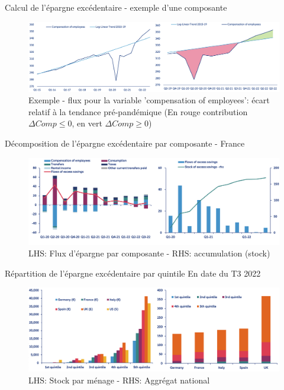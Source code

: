 \documentclass[9pt, xcolor={dvipsnames}]{beamer}
\begin{document}
\begin{frame}{Calcul de l'épargne excédentaire - exemple d'une composante}
  \begin{figure}
    \centering
    \includegraphics[width=1\textwidth]{img/excess_chart.png}
    \caption{Exemple - flux pour la variable 'compensation of employees': écart relatif à la tendance pré-pandémique (En rouge contribution $\Delta Comp \leq 0$, en vert $\Delta Comp \geq  0$)}
  \end{figure}
\end{frame}

\begin{frame}{Décomposition de l'épargne excédentaire par composante - France}
  \begin{figure}
    \centering
    \includegraphics[width=1\textwidth]{img/xFrance.png}
    \caption{LHS: Flux d'épargne par composante - RHS: accumulation (stock)}
  \end{figure}
\end{frame}

\begin{frame}{Répartition de l'épargne excédentaire par quintile}
  En date du T3 2022
  \begin{figure}
    \centering
    \includegraphics[width=1\textwidth]{img/xSavings.png}
    \caption{LHS: Stock par ménage - RHS: Aggrégat national}
  \end{figure}
\end{frame}
\end{document}

